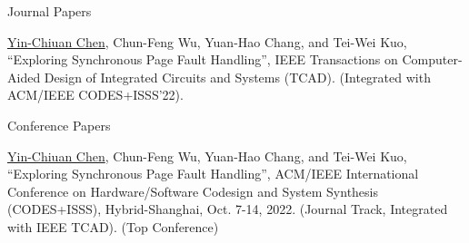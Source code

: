 

\begin{cventries}

  \cvpub
    {Journal Papers}
    {
      \begin{cvitems}
        \item {\underline{Yin-Chiuan Chen}, Chun-Feng Wu, Yuan-Hao Chang, and Tei-Wei Kuo, “Exploring Synchronous Page Fault Handling”, IEEE Transactions on Computer-Aided Design of Integrated Circuits and Systems (TCAD). (Integrated with ACM/IEEE CODES+ISSS’22).}
      \end{cvitems}
    }

  \cvpub
    {Conference Papers}
    {
      \begin{cvitems}
        \item {\underline{Yin-Chiuan Chen}, Chun-Feng Wu, Yuan-Hao Chang, and Tei-Wei Kuo, “Exploring Synchronous Page Fault Handling”, ACM/IEEE International Conference on Hardware/Software Codesign and System Synthesis (CODES+ISSS), Hybrid-Shanghai, Oct. 7-14, 2022. (Journal Track, Integrated with IEEE TCAD). (Top Conference)}
      \end{cvitems}
    }

\end{cventries}